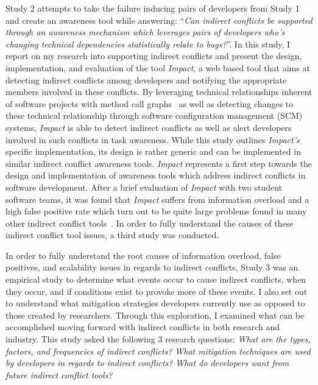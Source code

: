 Study 2 attempts to take the failure inducing pairs of developers from Study 1 and create an awareness tool while
answering: ``\textit{Can indirect conflicts be supported through an awareness mechanism which leverages pairs of
developers who's changing technical dependencies statistically relate to bugs?}''.
In this study, I report on my research into supporting indirect conflicts and present the design, implementation, and 
evaluation of the tool \textit{Impact}, a web based tool that aims at detecting indirect conflicts among developers and 
notifying the appropriate members involved in these conflicts. By leveraging technical relationships inherent of software 
projects with method call graphs~\cite{Lakhotia:1993:CCM} as well as detecting changes to these technical relationship 
through software configuration management (SCM) systems, \textit{Impact} is able to detect indirect conflicts as well as 
alert developers involved in such conflicts in task awareness. While this study outlines \textit{Impact's} specific 
implementation, its design is rather generic and can be implemented in similar indirect conflict awareness tools. 
\textit{Impact} represents a first step towards the design and implementation of awareness tools which address indirect 
conflicts in software development. After a brief evaluation of \textit{Impact} with two student software teams, it was
found that \textit{Impact} suffers from information overload and a high false positive rate which turn out to be quite
large problems found in many other indirect conflict
tools~\cite{Sarma:2007:TSA, Holmes:2010:CAR, Trainer:2005:BGT, Servant:2010:CPI, Borici:2012:CHA}. In order to fully understand 
the causes of these indirect conflict tool issues, a third study was conducted.


In order to fully understand the root causes of information overload, false positives, and
scalability issues in regards to indirect conflicts, Study 3 was an empirical study to determine what events occur to
cause indirect conflicts, when they occur, and if conditions exist to provoke more of these events. 
I also set out to understand what mitigation strategies developers currently use as opposed to those created
by researchers. Through this exploration, I examined what can be accomplished moving forward with indirect conflicts
in both research and industry. This study asked the following 3 research questions: 
\textit{What are the types, factors, and frequencies of indirect conflicts?}
\textit{What mitigation techniques are used by developers in regards to indirect conflicts?}
\textit{What do developers want from future indirect conflict tools?}

